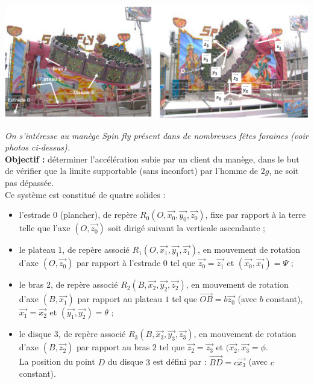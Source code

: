 \newpage


\begin{center}
\includegraphics[scale=0.3]{png/manege.png}
\end{center}

\textit{On s'intéresse au manège Spin fly présent dans de nombreuses fêtes foraines (voir photos ci-dessus).}\\
\textbf{Objectif :} déterminer l'accélération subie par un client du manège, dans le but de vérifier que la limite supportable (sans inconfort) par l'homme de $2g$, ne soit pas dépassée.\\
Ce système est constitué de quatre solides :
\begin{itemize}
\item l'estrade $0$ (plancher), de repère $R_0(O,\overrightarrow{x_0},\overrightarrow{y_0},\overrightarrow{z_0})$, fixe par rapport à la terre telle que l'axe $(O,\overrightarrow{z_0})$ soit dirigé suivant la verticale ascendante ;
\item le plateau $1$, de repère associé $R_1(O,\overrightarrow{x_1},\overrightarrow{y_1},\overrightarrow{z_1})$, en mouvement de rotation d'axe $(O,\overrightarrow{z_0})$ par rapport à l'estrade $0$ tel que $\overrightarrow{z_0}=\overrightarrow{z_1}$ et $(\overrightarrow{x_0},\overrightarrow{x_1})=\Psi$ ;
\item le bras $2$, de repère associé $R_2(B,\overrightarrow{x_2},\overrightarrow{y_2},\overrightarrow{z_2})$, en mouvement de rotation d'axe $(B,\overrightarrow{x_1})$ par rapport au plateau $1$ tel que $\overrightarrow{OB}=b\overrightarrow{z_0}$ (avec $b$ constant), $\overrightarrow{x_1}=\overrightarrow{x_2}$ et $(\overrightarrow{y_1},\overrightarrow{y_2})=\theta$ ;
\item le disque $3$, de repère associé $R_3(B,\overrightarrow{x_3},\overrightarrow{y_3},\overrightarrow{z_3})$, en mouvement de rotation d'axe $(B,\overrightarrow{z_2})$ par rapport au bras $2$ tel que $\overrightarrow{z_2}=\overrightarrow{z_3}$ et $(\overrightarrow{x_2},\overrightarrow{x_3}=\phi$.\\
La position du point $D$ du disque $3$ est défini par : $\overrightarrow{BD}=c\overrightarrow{x_3}$ (avec $c$ constant).
\end{itemize}

